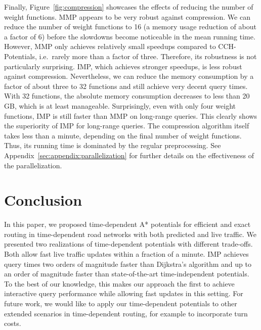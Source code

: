 \documentclass[a4paper,UKenglish,cleveref, autoref, thm-restate]{lipics-v2021}
\begin{document}
Finally, Figure~\ref{fig:compression} showcases the effects of reducing the number of weight functions.
MMP appears to be very robust against compression.
We can reduce the number of weight functions to 16 (a memory usage reduction of about a factor of 6) before the slowdowns become noticeable in the mean running time.
However, MMP only achieves relatively small speedups compared to CCH-Potentials, i.e.\ rarely more than a factor of three.
Therefore, its robustness is not particularly surprising.
IMP, which achieves stronger speedups, is less robust against compression.
Nevertheless, we can reduce the memory consumption by a factor of about three to 32 functions and still achieve very decent query times.
With 32 functions, the absolute memory consumption decreases to less than 20\,GB, which is at least manageable.
Surprisingly, even with only four weight functions, IMP is still faster than MMP on long-range queries.
This clearly shows the superiority of IMP for long-range queries.
The compression algorithm itself takes less than a minute, depending on the final number of weight functions.
Thus, its running time is dominated by the regular preprocessing.
See Appendix~\ref{sec:appendix:parallelization} for further details on the effectiveness of the parallelization.

\section{Conclusion}

In this paper, we proposed time-dependent A* potentials for efficient and exact routing in time-dependent road networks with both predicted and live traffic.
We presented two realizations of time-dependent potentials with different trade-offs.
Both allow fast live traffic updates within a fraction of a minute.
IMP achieves query times two orders of magnitude faster than Dijkstra's algorithm and up to an order of magnitude faster than state-of-the-art time-independent potentials.
To the best of our knowledge, this makes our approach the first to achieve interactive query performance while allowing fast updates in this setting.
For future work, we would like to apply our time-dependent potentials to other extended scenarios in time-dependent routing, for example to incorporate turn costs.

\end{document}

